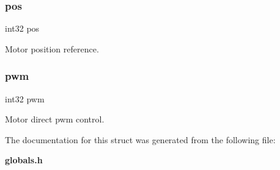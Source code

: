 \subsubsection{pos}
{\footnotesize\ttfamily int32 pos}

Motor position reference. \mbox{\label{structst__ref_af8587579fb553575d315bfe2e3183bc4}} 
\subsubsection{pwm}
{\footnotesize\ttfamily int32 pwm}

Motor direct pwm control. 

The documentation for this struct was generated from the following file\+:\begin{DoxyCompactItemize}
\item 
\textbf{ globals.\+h}\end{DoxyCompactItemize}
